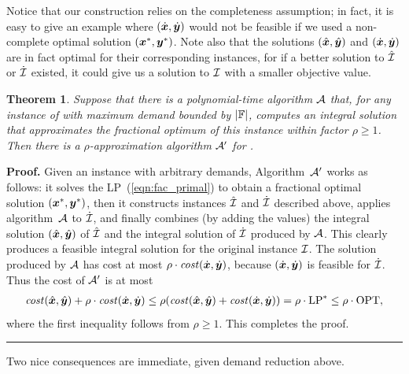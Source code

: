 \documentclass[oneside,final]{ucr}
\newtheorem{theorem}{Theorem}
\newenvironment{proof}[1][Proof]{\textbf{#1.} }{\ \rule{0.5em}{0.5em}}
\begin{document}
Notice that our construction relies on the completeness assumption; in fact, it is
easy to give an example where $(\dot{\boldsymbol{x}}, \dot{\boldsymbol{y}})$ would not be feasible if we
used a non-complete optimal solution $(\boldsymbol{x}^\ast,\boldsymbol{y}^\ast)$.
Note also that the solutions $(\hat{\boldsymbol{x}},\hat{\boldsymbol{y}})$ and $(\dot{\boldsymbol{x}}, \dot{\boldsymbol{y}})$ are in fact
optimal for their corresponding instances, for if a better solution to $\hatcalI$ or
$\dotcalI$ existed, it could
give us a solution to $\mathcal{I}$ with a smaller objective value.


\begin{theorem}\label{thm: reduction to polynomial}
  Suppose that there is a polynomial-time algorithm $\calA$
  that, for any instance of {\FTFP} with maximum demand
  bounded by $|\mathbb{F}|$, computes an integral solution
  that approximates the fractional optimum of this instance
  within factor $\rho\geq 1$.  Then there is a
  $\rho$-approximation algorithm $\calA'$ for {\FTFP}.
\end{theorem}


\begin{proof}
  Given an {\FTFP} instance with arbitrary demands, Algorithm~$\calA'$ works
as follows: it solves the LP~(\ref{eqn:fac_primal}) to obtain a
  fractional optimal solution $(\boldsymbol{x}^\ast,\boldsymbol{y}^\ast)$, then it constructs
  instances $\hatcalI$ and $\dotcalI$ described above,  applies
  algorithm~$\calA$ to $\dotcalI$, and finally combines (by adding
  the values) the integral solution $(\hat{\boldsymbol{x}}, \hat{\boldsymbol{y}})$ of
  $\hatcalI$ and the integral solution of $\dotcalI$ produced
  by $\calA$. This clearly produces a feasible integral
  solution for the original instance $\mathcal{I}$.
The solution produced by $\calA$ has cost at most
$\rho\cdot{\it cost}(\dot{\boldsymbol{x}},\dot{\boldsymbol{y}})$, because $(\dot{\boldsymbol{x}},\dot{\boldsymbol{y}})$
is feasible for $\dotcalI$. Thus the cost of $\calA'$ is at most
% 
 \begin{align*}
 {\it cost}(\hat{\boldsymbol{x}}, \hat{\boldsymbol{y}}) + \rho\cdot{\it cost}(\dot{\boldsymbol{x}},\dot{\boldsymbol{y}})
	\le
 \rho({\it cost}(\hat{\boldsymbol{x}}, \hat{\boldsymbol{y}}) + {\it cost}(\dot{\boldsymbol{x}},\dot{\boldsymbol{y}}))
		= \rho\cdot\mbox{\rm LP}^\ast \le \rho\cdot\mbox{\rm OPT},
  \end{align*}
%
where the first inequality follows from $\rho\geq 1$. This completes
the proof.
\end{proof}

Two nice consequences are immediate, given demand reduction
above.
\end{document}
